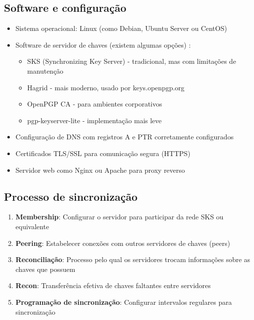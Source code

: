 \subsection{Software e configuração}
\begin{itemize}
    \item Sistema operacional: Linux (como Debian, Ubuntu Server ou CentOS)
    \item Software de servidor de chaves (existem algumas opções) \cite{fiskerstrand2019guide}:
    \begin{itemize}
        \item SKS (Synchronizing Key Server) - tradicional, mas com limitações de manutenção
        \item Hagrid - mais moderno, usado por keys.openpgp.org
        \item OpenPGP CA - para ambientes corporativos
        \item pgp-keyserver-lite - implementação mais leve
    \end{itemize}
    \item Configuração de DNS com registros A e PTR corretamente configurados
    \item Certificados TLS/SSL para comunicação segura (HTTPS)
    \item Servidor web como Nginx ou Apache para proxy reverso
\end{itemize}

\subsection{Processo de sincronização}
\begin{enumerate}
    \item \textbf{Membership}: Configurar o servidor para participar da rede SKS ou equivalente \cite{sksdoc}
    \item \textbf{Peering}: Estabelecer conexões com outros servidores de chaves (peers)
    \item \textbf{Reconciliação}: Processo pelo qual os servidores trocam informações sobre as chaves que possuem
    \item \textbf{Recon}: Transferência efetiva de chaves faltantes entre servidores
    \item \textbf{Programação de sincronização}: Configurar intervalos regulares para sincronização
\end{enumerate}

